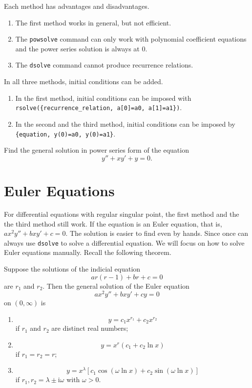 \documentclass[
  12pt]{elegantbook}
\providecommand{\tightlist}{%
  \setlength{\itemsep}{0pt}\setlength{\parskip}{0pt}}
\begin{document}
Each method has advantages and disadvantages.

\begin{enumerate}
\def\labelenumi{\arabic{enumi}.}
\tightlist
\item
  The first method works in general, but not efficient.
\item
  The \texttt{powsolve} command can only work with polynomial coefficient equations and the power series solution is always at 0.
\item
  The \texttt{dsolve} command cannot produce recurrence relations.
\end{enumerate}

In all three methods, initial conditions can be added.

\begin{enumerate}
\def\labelenumi{\arabic{enumi}.}
\tightlist
\item
  In the first method, initial conditions can be imposed with \texttt{rsolve(\{recurrence\_relation,\ a{[}0{]}=a0,\ a{[}1{]}=a1\})}.
\item
  In the second and the third method, initial conditions can be imposed by \texttt{\{equation,\ y(0)=a0,\ y\textquotesingle{}(0)=a1\}}.
\end{enumerate}

\begin{exercise}
Find the general solution in power series form of the equation
\[y''+ xy'+y=0.\]
\end{exercise}

\hypertarget{euler-equations}{%
\section{Euler Equations}\label{euler-equations}}

For differential equations with regular singular point, the first method and the the third method still work. If the equation is an Euler equation, that is, \(ax^2y''+bxy'+c=0\). The solution is easier to find even by hands. Since once can always use \texttt{dsolve} to solve a differential equation. We will focus on how to solve Euler equations manually. Recall the following theorem.

\begin{theorem}

Suppose the solutions of the indicial equation
\[ar(r-1)+br+c=0\]
are \(r_1\) and \(r_2\). Then the general solution of the Euler equation
\[ax^2y''+bxy'+cy=0\]
on \((0,\infty)\) is

\begin{enumerate}
\def\labelenumi{\arabic{enumi}.}
\item
  \[y= c_1x^{r_1}+c_2x^{r_2}\]
  if \(r_1\) and \(r_2\) are distinct real numbers;
\item
  \[y= x^{r}(c_1+c_2\ln x)\]
  if \(r_1=r_2=r\);
\item
  \[y=x^{\lambda}\left[c_1\cos\left(\omega\ln x\right)+ c_2\sin\left(\omega\ln x \right)\right]\]
  if \(r_1,r_2=\lambda\pm \mathrm{i}\omega\) with \(\omega>0\).
\end{enumerate}

\end{theorem}
\end{document}
